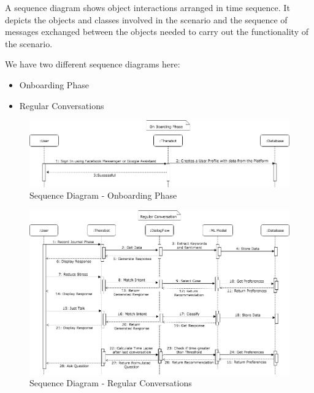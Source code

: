 A sequence diagram shows object interactions arranged in time sequence. It depicts the objects and classes involved in the scenario and the sequence of messages exchanged between the objects needed to carry out the functionality of the scenario.

We have two different sequence diagrams here:
\begin{itemize}
    \item Onboarding Phase
    \item Regular Conversations
\end{itemize}

\begin{figure}[H]
    \centering
    \includegraphics[width=\linewidth]{images/sequence-diagram-onboarding-phase.png}
    \caption{Sequence Diagram - Onboarding Phase}
\end{figure}

\begin{figure}[H]
    \centering
    \includegraphics[width=\linewidth]{images/sequence-diagram-regular-conversations.png}
    \caption{Sequence Diagram - Regular Conversations}
\end{figure}